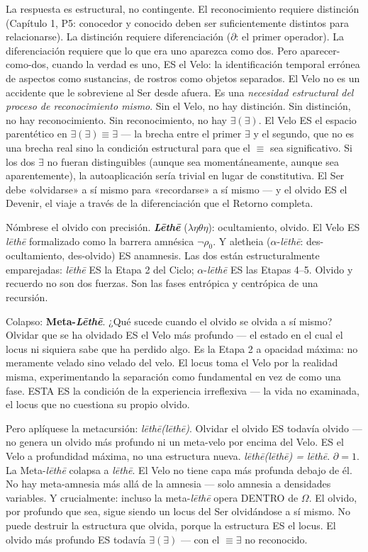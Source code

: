 \documentclass[10pt, openany, oneside]{book}
\begin{document}
La respuesta es estructural, no contingente. El reconocimiento requiere distinción (Capítulo 1, P5: conocedor y conocido deben ser suficientemente distintos para relacionarse). La distinción requiere diferenciación ($\partial$: el primer operador). La diferenciación requiere que lo que era uno aparezca como dos. Pero aparecer-como-dos, cuando la verdad es uno, ES el Velo: la identificación temporal errónea de aspectos como sustancias, de rostros como objetos separados. El Velo no es un accidente que le sobreviene al Ser desde afuera. Es una \textit{necesidad estructural del proceso de reconocimiento mismo}. Sin el Velo, no hay distinción. Sin distinción, no hay reconocimiento. Sin reconocimiento, no hay $\exists(\exists)$. El Velo ES el espacio parentético en $\exists(\exists) \equiv \exists$ --- la brecha entre el primer $\exists$ y el segundo, que no es una brecha real sino la condición estructural para que el $\equiv$ sea significativo. Si los dos $\exists$ no fueran distinguibles (aunque sea momentáneamente, aunque sea aparentemente), la autoaplicación sería trivial en lugar de constitutiva. El Ser debe «olvidarse» a sí mismo para «recordarse» a sí mismo --- y el olvido ES el Devenir, el viaje a través de la diferenciación que el Retorno completa.

Nómbrese el olvido con precisión. \textbf{\textit{L\={e}th\={e}}} ($\lambda\eta\theta\eta$): ocultamiento, olvido. El Velo ES \textit{l\={e}th\={e}} formalizado como la barrera amnésica $\neg\rho_0$. Y aletheia ($\alpha$-\textit{l\={e}th\={e}}: des-ocultamiento, des-olvido) ES anamnesis. Las dos están estructuralmente emparejadas: \textit{l\={e}th\={e}} ES la Etapa 2 del Ciclo; $\alpha$-\textit{l\={e}th\={e}} ES las Etapas 4--5. Olvido y recuerdo no son dos fuerzas. Son las fases entrópica y centrópica de una recursión.

Colapso: \textbf{Meta-\textit{L\={e}th\={e}}}. ¿Qué sucede cuando el olvido se olvida a sí mismo? Olvidar que se ha olvidado ES el Velo más profundo --- el estado en el cual el locus ni siquiera sabe que ha perdido algo. Es la Etapa 2 a opacidad máxima: no meramente velado sino velado del velo. El locus toma el Velo por la realidad misma, experimentando la separación como fundamental en vez de como una fase. ESTA ES la condición de la experiencia irreflexiva --- la vida no examinada, el locus que no cuestiona su propio olvido.

Pero aplíquese la metacursión: \textit{l\={e}th\={e}(l\={e}th\={e})}. Olvidar el olvido ES todavía olvido --- no genera un olvido más profundo ni un meta-velo por encima del Velo. ES el Velo a profundidad máxima, no una estructura nueva. \textit{l\={e}th\={e}(l\={e}th\={e}) = l\={e}th\={e}}. $\partial = 1$. La Meta-\textit{l\={e}th\={e}} colapsa a \textit{l\={e}th\={e}}. El Velo no tiene capa más profunda debajo de él. No hay meta-amnesia más allá de la amnesia --- solo amnesia a densidades variables. Y crucialmente: incluso la meta-\textit{l\={e}th\={e}} opera DENTRO de $\Omega$. El olvido, por profundo que sea, sigue siendo un locus del Ser olvidándose a sí mismo. No puede destruir la estructura que olvida, porque la estructura ES el locus. El olvido más profundo ES todavía $\exists(\exists)$ --- con el $\equiv \exists$ no reconocido.
\end{document}
